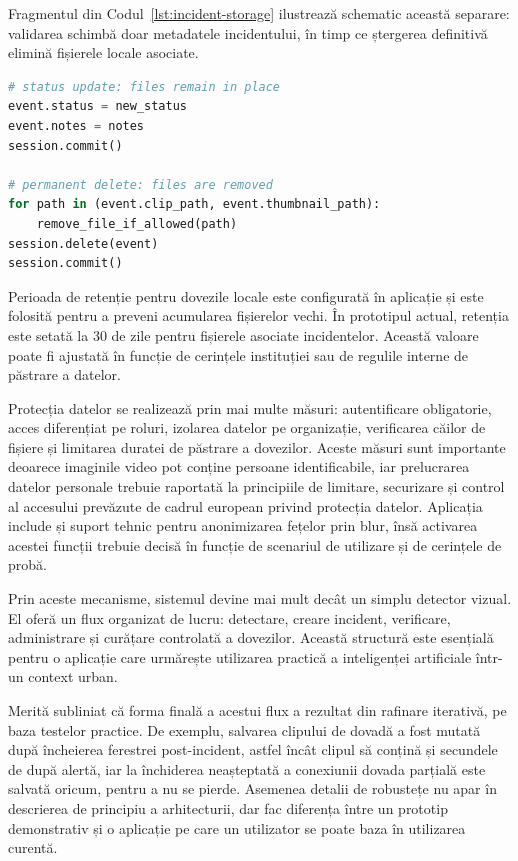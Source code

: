 Fragmentul din Codul~\ref{lst:incident-storage} ilustrează schematic această separare: validarea schimbă doar metadatele incidentului, în timp ce ștergerea definitivă elimină fișierele locale asociate.

\begin{lstlisting}[float=!htbp,language=Python,basicstyle=\ttfamily\scriptsize,caption={Separarea schimbării de status de ștergerea dovezilor locale},label={lst:incident-storage}]
# status update: files remain in place
event.status = new_status
event.notes = notes
session.commit()

# permanent delete: files are removed
for path in (event.clip_path, event.thumbnail_path):
    remove_file_if_allowed(path)
session.delete(event)
session.commit()
\end{lstlisting}

Perioada de retenție pentru dovezile locale este configurată în aplicație și este folosită pentru a preveni acumularea fișierelor vechi. În prototipul actual, retenția este setată la 30 de zile pentru fișierele asociate incidentelor. Această valoare poate fi ajustată în funcție de cerințele instituției sau de regulile interne de păstrare a datelor.

Protecția datelor se realizează prin mai multe măsuri: autentificare obligatorie, acces diferențiat pe roluri, izolarea datelor pe organizație, verificarea căilor de fișiere și limitarea duratei de păstrare a dovezilor. Aceste măsuri sunt importante deoarece imaginile video pot conține persoane identificabile, iar prelucrarea datelor personale trebuie raportată la principiile de limitare, securizare și control al accesului prevăzute de cadrul european privind protecția datelor. Aplicația include și suport tehnic pentru anonimizarea fețelor prin blur, însă activarea acestei funcții trebuie decisă în funcție de scenariul de utilizare și de cerințele de probă.

Prin aceste mecanisme, sistemul devine mai mult decât un simplu detector vizual. El oferă un flux organizat de lucru: detectare, creare incident, verificare, administrare și curățare controlată a dovezilor. Această structură este esențială pentru o aplicație care urmărește utilizarea practică a inteligenței artificiale într-un context urban.

Merită subliniat că forma finală a acestui flux a rezultat din rafinare iterativă, pe baza testelor practice. De exemplu, salvarea clipului de dovadă a fost mutată după încheierea ferestrei post-incident, astfel încât clipul să conțină și secundele de după alertă, iar la închiderea neașteptată a conexiunii dovada parțială este salvată oricum, pentru a nu se pierde. Asemenea detalii de robustețe nu apar în descrierea de principiu a arhitecturii, dar fac diferența între un prototip demonstrativ și o aplicație pe care un utilizator se poate baza în utilizarea curentă.
